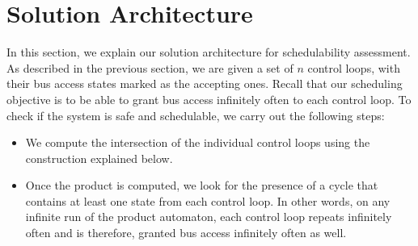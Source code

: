 \section{Solution Architecture} \label{sec4}
\noindent
In this section, we explain our solution architecture for schedulability assessment. As described in the previous section,
we are given a set of $n$ control loops, with their bus access states marked as the accepting ones. Recall that our
scheduling objective is to be able to grant bus access infinitely often to each control loop. To check if the system
is safe and schedulable, we carry out the following steps: 

\begin{itemize}

\item We compute the intersection of the individual control loops using the construction explained below. 

\item Once the product is computed, we look for the presence of a cycle that contains at least one state
from each control loop. In other words, on any infinite run of the product automaton, each control loop
repeats infinitely often and is therefore, granted bus access infinitely often as well. \\

\end{itemize}

